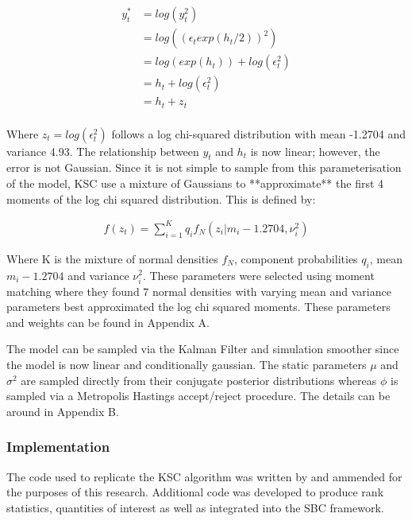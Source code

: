 \documentclass[12pt, a4paper]{article}
\begin{document}
        $$
        \begin{aligned}
        y_t^{*} &= log(y_t^2) \\ 
        &= log((\epsilon_t exp(h_t/2))^2) \\
        &=  log(exp(h_t)) + log(\epsilon_t^2) \\
        &= h_t + log(\epsilon_t^2)  \\
        &= h_t + z_t \\
        \end{aligned}
        $$

        Where $z_t = log(\epsilon_t^2)$ follows a log chi-squared distribution with mean -1.2704 and variance 4.93. The relationship between $y_t$ and $h_t$ is now linear; however, the error is not Gaussian. Since it is not simple to sample from this parameterisation of the model, KSC use a mixture of Gaussians to **approximate** the first 4 moments of the log chi squared distribution. This is defined by:

        $$
        \begin{aligned}
        f(z_t) = \sum_{i=1}^{K} q_if_N(z_i|m_i-1.2704, \nu_i^2)
        \end{aligned}
        $$

        Where K is the mixture of normal densities $f_N$, component probabilities $q_i$, mean $m_i-1.2704$ and variance $\nu_i^2$. These parameters were selected using moment matching where they found 7 normal densities with varying mean and variance parameters best approximated the log chi squared moments. These parameters and weights can be found in Appendix A.

        The model can be sampled via the Kalman Filter and simulation smoother since the model is now linear and conditionally gaussian. The static parameters $\mu$ and $\sigma^2$ are sampled directly from their conjugate posterior distributions whereas $\phi$ is sampled via a Metropolis Hastings accept/reject procedure. The details can be around in Appendix B. 

        \subsubsection*{Implementation}
        The code used to replicate the KSC algorithm was written by \citet{chad2018} and ammended for the purposes of this research. Additional code was developed to produce rank statistics, quantities of interest as well as integrated into the SBC framework. 
        
\end{document}
